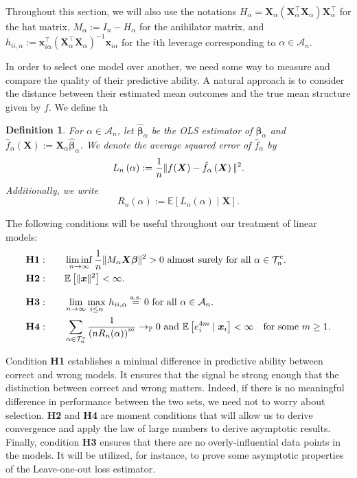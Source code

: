 \documentclass[11pt, letter paper]{article}
\newcommand{\1}{\mathmybb{1}}
\newtheorem{definition}{Definition}[section]
\newcommand{\0}{\emptyset}
\newcommand{\prob}{\mathbb{P}}
\newcommand{\Ep}[1]{\mathbb{E}\left[ #1 \right]}
\newcommand{\paren}[1]{\left(#1 \right)}
\newcommand{\norm}[1]{|\hspace{-1pt}|#1 |\hspace{-1pt}|}
\newcommand{\normsq}[1]{\norm{#1}^{2}}
\newcommand{\Acal}{\mathcal{A}_{n}}
\newcommand{\Tcal}{\mathcal{T}_{n}}
\newcommand{\aseq}{\stackrel{\mathrm{a.s.}}{=}}
\newcommand{\X}{\boldsymbol{X}}
\newcommand{\x}{\boldsymbol{x}}
\newcommand{\bbeta}{\boldsymbol{\beta}}
\newcommand{\bbetahat}{\boldsymbol{\hat{\beta}}}
\newcommand{\Loss}[1]{L_{n}\paren{#1}}
\begin{document}
Throughout this section, we will also use the notations \(H_{\alpha} = \X_{\alpha}\paren{\X_{\alpha}^{\top}\X_{\alpha}}\X_{\alpha}^{\top}\) for the hat matrix, \(M_{\alpha}:=I_{n}-H_{\alpha}\) for the anihilator matrix, and \(h_{ii,\alpha}:=\x_{i\alpha}^{\top}{(\X_{\alpha}^{\top}\X_{\alpha})}^{-1}\x_{i\alpha}\) for the \(i\)th leverage corresponding to \(\alpha\in\Acal\).

In order to select one model over another, we need some way to measure and compare the quality of their predictive ability. A natural approach is to consider the distance between their estimated mean outcomes and the true mean structure given by \(f\). We define th

\begin{definition}\label{def:loss}
    For \(\alpha\in\Acal\), let \(\bbetahat_{\alpha}\) be the OLS estimator of \(\bbeta_{\alpha}\) and \(\hat{f}_{\alpha}(\X):=\X_{\alpha}\bbetahat_{\alpha}\). We denote the average squared error of \(\hat{f}_{\alpha}\) by
    \[\Loss{\alpha}:=\frac{1}{n}\normsq{f(\X) - \hat{f}_{\alpha}\paren{\X}}.\]
    Additionally, we write
    \[R_{n}(\alpha):= \Ep{\Loss{\alpha}\mid\X}.\]
\end{definition}

The following conditions will be useful throughout our treatment of linear models:
\begin{align*}
    &\mathbf{H1:}\qquad \liminf_{n\to\infty} \frac{1}{n}\normsq{M_{\alpha}\X\bbeta}>0 \text{ almost surely for all }\alpha \in\Tcal^{c}.\\
    &\mathbf{H2:} \qquad \Ep{\normsq{\x}}<\infty.\\[2.5mm]
    &\mathbf{H3:}\qquad \lim_{n\to\infty}\max_{i\leq n}\,h_{ii,\alpha} \aseq 0 \text{ for all }\alpha \in\Acal.\\
    &\mathbf{H4:}\qquad \sum_{\alpha\in\Tcal^{c}}\frac{1}{\paren{nR_{n}(\alpha)}^{m}}\to_{\prob}0\text{ and }\Ep{e_i^{4m}\mid\x_i}<\infty\quad\text{for some }m\geq 1.
\end{align*}

Condition \textbf{H1} establishes a minimal difference in predictive ability between correct and wrong models. It ensures that the signal be strong enough that the distinction between correct and wrong matters. Indeed, if there is no meaningful difference in performance between the two sets, we need not to worry about selection.
\textbf{H2} and \textbf{H4} are moment conditions that will allow us to derive convergence and apply the law of large numbers to derive asymptotic results.
Finally, condition \textbf{H3} ensures that there are no overly-influential data points in the models. It will be utilized, for instance, to prove some asymptotic properties of the Leave-one-out loss estimator.
\end{document}

